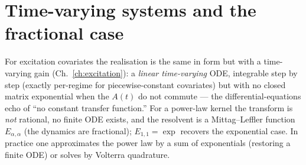 \section{Time-varying systems and the fractional case}

For excitation covariates the realisation is the same in form but with a
time-varying gain (Ch.~\ref{ch:excitation}): a \emph{linear time-varying} ODE,
integrable step by step (exactly per-regime for piecewise-constant covariates) but
with no closed matrix exponential when the $A(t)$ do not commute --- the
differential-equations echo of ``no constant transfer function.'' For a power-law
kernel the transform is \emph{not} rational, no finite ODE exists, and the resolvent
is a Mittag--Leffler function $E_{\alpha,\alpha}$ (the dynamics are fractional);
$E_{1,1}=\exp$ recovers the exponential case. In practice one approximates the
power law by a sum of exponentials (restoring a finite ODE) or solves by Volterra
quadrature.
